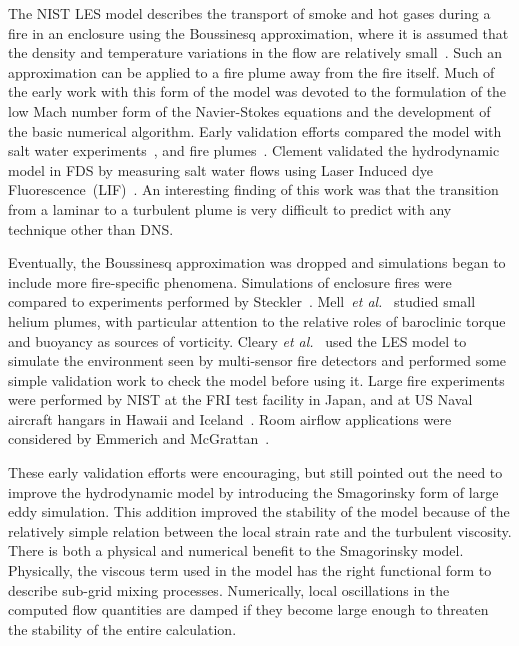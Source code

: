 The  NIST LES model  describes the  transport of  smoke and  hot gases during  a fire  in an  enclosure using  the  Boussinesq approximation, where
it is assumed that the density and temperature variations in the flow                           are                          relatively
small~\cite{Rehm:1,Rehm:SIAM83,Rehm:ANM85,Rehm:IAFSS3}.     Such    an approximation  can be  applied  to a  fire  plume away  from the  fire itself.
Much of  the early  work  with this  form of  the model  was devoted  to  the  formulation of  the  low  Mach  number form  of  the Navier-Stokes
equations and  the development  of the  basic numerical algorithm.   Early validation  efforts  compared the  model with  salt water
experiments~\cite{Baum:1,McGrattan:1,Rehm:IAFSS5},   and  fire plumes~\cite{Baum:IAFSS5,Baum:2,Baum:3,Baum:4}.  Clement validated the hydrodynamic
model  in FDS by  measuring salt water flows  using Laser Induced   dye   Fluorescence~(LIF)~\cite{Clement:1}.  An   interesting finding  of this
work was  that the  transition from  a laminar  to a turbulent plume is very difficult  to predict with any technique other than DNS.

Eventually, the  Boussinesq approximation was  dropped and simulations began  to   include  more  fire-specific   phenomena.  Simulations  of
enclosure   fires   were   compared   to  experiments   performed   by Steckler~\cite{McGrattan:4}.  Mell~{\em  et al.}~\cite{Mell:1} studied small
helium  plumes, with particular attention to  the relative roles of  baroclinic torque and  buoyancy as  sources of  vorticity.  Cleary {\em  et
al.}~\cite{LES:6}  used   the  LES  model  to  simulate  the environment  seen by  multi-sensor fire  detectors and  performed some simple validation
work to check the model before using it.  Large fire experiments were performed by NIST  at the FRI test facility in Japan, and at US Naval aircraft
hangars in Hawaii and Iceland~\cite{Davis:1}. Room   airflow   applications   were   considered  by   Emmerich   and
McGrattan~\cite{Emmerich:1,Emmerich:2}.

These early validation efforts were encouraging, but still pointed out the  need  to  improve  the  hydrodynamic  model  by  introducing  the
Smagorinsky form of large eddy simulation.  This addition improved the stability  of the  model  because of  the  relatively simple  relation between
the  local strain rate  and the turbulent viscosity.  There is both   a   physical  and   numerical   benefit   to  the   Smagorinsky model.
Physically,  the viscous term used  in the model  has the right functional  form to describe  sub-grid mixing  processes. Numerically, local
oscillations in the computed  flow quantities are damped if they become  large   enough  to  threaten  the  stability   of  the  entire calculation.






